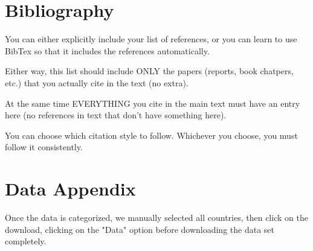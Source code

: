 \documentclass[12pt]{article}
\begin{document}
\newpage
\section*{Bibliography}
\singlespacing
\setlength\bibsep{0pt}

You can either explicitly include your list of references, or you can learn to use BibTex so that it includes the references automatically.

Either way, this list should include ONLY the papers (reports, book chatpers, etc.) that you actually cite in the text (no extra).

At the same time EVERYTHING you cite in the main text must have an entry here (no references in text that don't have something here).

You can choose which citation style to follow. Whichever you choose, you must follow it consistently.

\newpage
\section*{Data Appendix} \label{sec:appendixa}

Once the data is categorized, we manually selected all countries, then click on the download, clicking on the "Data" option before downloading the data set completely. 
\end{document}
